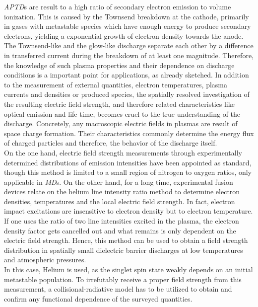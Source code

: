 \documentclass[a4paper,10pt]{article}
\newcommand{\tilt}[1]{\textit{#1}}
\begin{document}
		\tilt{APTD}s are result to a high ratio of secondary electron emission to volume ionization. This is caused by the Townsend breakdown at the cathode, primarily in gases with metastable species which have enough energy to produce secondary electrons, yielding a exponential growth of electron density towards the anode.\\
		The Townsend-like and the glow-like discharge separate each other by a difference in transferred current during the breakdown of at least one magnitude. Therefore, the knowledge of such plasma properties and their dependence on discharge conditions is a important point for applications, as already sketched. In addition to the measurement of external quantities, electron temperatures, plasma currents and densities or produced species, the spatially resolved investigation of the resulting electric field strength, and therefore related characteristics like optical emission and life time, becomes cruel to the true understanding of the discharge. Concretely, any macroscopic electric fields in plasmas are result of space charge formation. Their characteristics commonly determine the energy flux of charged particles and therefore, the behavior of the discharge itself. \\
		On the one hand, electric field strength measurements through experimentally determined distributions of emission intensities have been appointed as standard, though this method is limited to a small region of nitrogen to oxygen ratios, only applicable in \tilt{MD}s. On the other hand, for a long time, experimental fusion devices relate on the helium line intensity ratio method to determine electron densities, temperatures and the local electric field strength. In fact, electron impact excitations are insensitive to electron density but to electron temperature. If one uses the ratio of two line intensities excited in the plasma, the electron density factor gets cancelled out and what remains is only dependent on the electric field strength. Hence, this method can be used to obtain a field strength distribution in spatially small dielectric barrier discharges at low temperatures and atmospheric pressures.\\
		In this case, Helium is used, as the singlet spin state weakly depends on an initial metastable population. To irrefutably receive a proper field strength from this measurement, a collisional-radiative model has to be utilized to obtain and confirm any functional dependence of the surveyed quantities.\\
\end{document}
